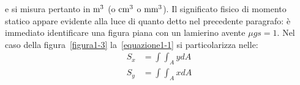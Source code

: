 \noindent e si misura pertanto in $\textup{m}^3$ (o $\textup{cm}^3$ o $\textup{mm}^3$). Il significato fisico di momento statico appare evidente alla luce di quanto detto nel precedente paragrafo: è immediato identificare una figura piana con un lamierino avente $\mu gs = 1$. Nel caso della figura~\ref{figura1-3} la~\eqref{equazione1-1} si particolarizza nelle: 
\begin{align} 
\label{equazione1-2}
S_x    &= \int\int_A ydA \tag{1.2a} \\
S_y    &= \int\int_A xdA \tag{1.2b}
\end{align}
